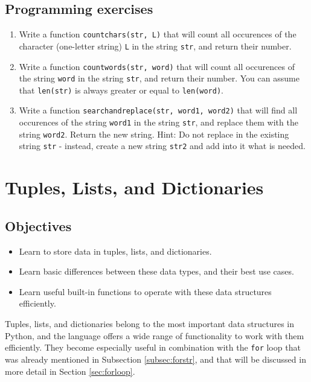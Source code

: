 \subsection{Programming exercises}

\begin{enumerate}
\item Write a function {\tt countchars(str, L)} that will count 
all occurences of the character (one-letter string) {\tt L} in the string {\tt str}, 
and return their number. 
\item Write a function {\tt countwords(str, word)} that will count 
all occurences of the string {\tt word} in the string {\tt str}, and 
return their number. You can assume that {\tt len(str)} is always greater 
or equal to {\tt len(word)}.
\item Write a function {\tt searchandreplace(str, word1, word2)} that will 
find all occurences of the string {\tt word1} in the string {\tt str}, and 
replace them with the string {\tt word2}. Return the new string.
Hint: Do not replace in the existing string {\tt str} - instead, 
create a new string {\tt str2} and add into it what is needed.
\end{enumerate}



\section{Tuples, Lists, and Dictionaries}\label{sec:lists}

\subsection{Objectives}

\begin{itemize}
\item Learn to store data in tuples, lists, and dictionaries.
\item Learn basic differences between these data types, and their best use cases.
\item Learn useful built-in functions to operate with these data structures efficiently. 
\end{itemize}
Tuples, lists, and dictionaries belong to the most important data structures in Python, and the 
language offers a wide range of functionality to work with them efficiently. They become 
especially useful in combination with the {\tt for}
loop that was already mentioned in Subsection \ref{subsec:forstr}, and that will be 
discussed in more detail in Section \ref{sec:forloop}. 

